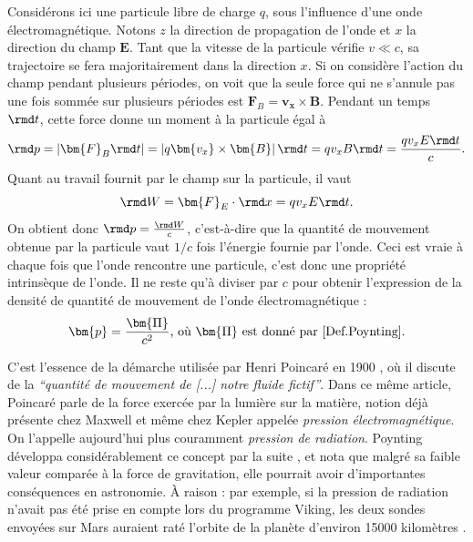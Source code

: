 Considérons ici une particule libre de charge $q$, sous l'influence d'une onde électromagnétique. Notons $z$ la direction de propagation de l'onde et $x$ la direction du champ $\bm{E}$. Tant que la vitesse de la particule vérifie $v \ll c$, sa trajectoire se fera majoritairement dans la direction $x$. Si on considère l'action du champ pendant plusieurs périodes, on voit que la seule force qui ne s'annule pas une fois sommée sur plusieurs périodes est $\bm{F}_B=\bm{v_x}\times\bm{B}$. Pendant un temps $\rmd t$, cette force donne un moment à la particule égal à
\begin{equation*}
\rmd p=\left|\bm{F}_B\rmd t\right|=\left|q\bm{v_x}\times\bm{B}\right|\rmd t=qv_xB\rmd t=\frac{qv_xE\rmd t}{c}.
\end{equation*}
Quant au travail fournit par le champ sur la particule, il vaut
\begin{equation*}
\rmd W=\bm{F}_E\cdot \rmd x=qv_xE\rmd t.
\end{equation*}
On obtient donc $\rmd p = \frac{\rmd W}{c}$, c'est-à-dire que la quantité de mouvement obtenue par la particule vaut $1/c$ fois l'énergie fournie par l'onde. Ceci est vraie à chaque fois que l'onde rencontre une particule, c'est donc une propriété intrinsèque de l'onde. Il ne reste qu'à diviser par $c$ pour obtenir l'expression de la densité de quantité de mouvement de l'onde électromagnétique :
\begin{equation}
\bm{p} = \frac{\bm{\Pi}}{c^2} \mbox{, où $\bm{\Pi}$ est donné par \ref{Def.Poynting}.}
\label{Eq.Defp}
\end{equation}

C'est l'essence de la démarche utilisée par Henri Poincaré en 1900 , où il discute de la \textit{``quantité de mouvement de [...] notre fluide fictif''}. Dans ce même article, Poincaré parle de la force exercée par la lumière sur la matière, notion déjà présente chez Maxwell et même chez Kepler appelée \textit{pression électromagnétique}. On l'appelle aujourd'hui plus couramment \textit{pression de radiation}. Poynting développa considérablement ce concept par la suite , et nota que malgré sa faible valeur comparée à la force de gravitation, elle pourrait avoir d'importantes conséquences en astronomie. \`{A} raison : par exemple, si la pression de radiation n'avait pas été prise en compte lors du programme Viking, les deux sondes envoyées sur Mars auraient raté l'orbite de la planète d'environ 15000 kilomètres .

